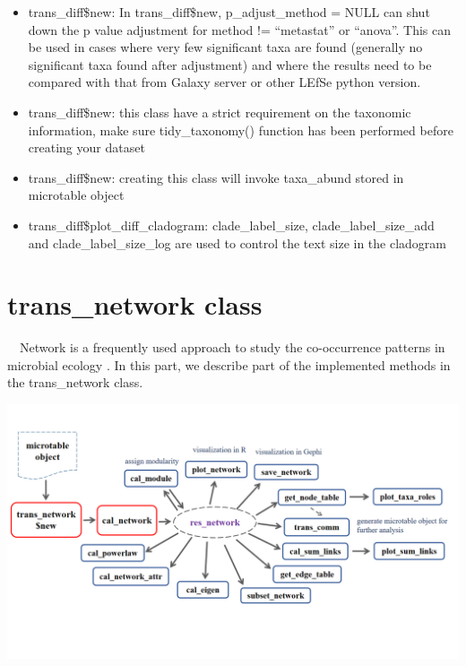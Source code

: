 \documentclass[
]{book}
\providecommand{\tightlist}{%
  \setlength{\itemsep}{0pt}\setlength{\parskip}{0pt}}
\begin{document}
\begin{itemize}
\tightlist
\item
  trans\_diff\$new: In trans\_diff\$new, p\_adjust\_method = NULL can shut down the p value adjustment for method != ``metastat'' or ``anova''.
  This can be used in cases where very few significant taxa are found (generally no significant taxa found after adjustment) and
  where the results need to be compared with that from Galaxy server or other LEfSe python version.
\item
  trans\_diff\$new: this class have a strict requirement on the taxonomic information, make sure tidy\_taxonomy() function has been performed before creating your dataset
\item
  trans\_diff\$new: creating this class will invoke taxa\_abund stored in microtable object
\item
  trans\_diff\$plot\_diff\_cladogram: clade\_label\_size, clade\_label\_size\_add and clade\_label\_size\_log are used to control the text size in the cladogram
\end{itemize}

\hypertarget{trans_network-class}{%
\section{trans\_network class}\label{trans_network-class}}

　Network is a frequently used approach to study the co-occurrence patterns in microbial ecology \citep{Deng_Molecular_2012, Faust_Microbial_2012, Coyte_Theecology_2015}.
In this part, we describe part of the implemented methods in the trans\_network class.

\begin{center}\includegraphics[width=8000px]{Images/network_framework} \end{center}
\end{document}
